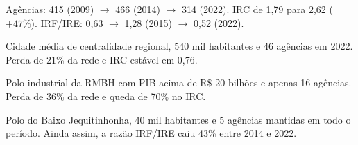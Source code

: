 \documentclass[aspectratio=169,10pt]{beamer}
\newcounter{quadrofinal}
\newcommand{\encerraanexos}{\setcounter{framenumber}{\value{quadrofinal}}}
\begin{document}
  {Agências: 415 (2009) $\to$ 466 (2014) $\to$ 314 (2022). IRC de 1,79 para 2,62
   ($+47\%$). IRF/IRE: 0,63 $\to$ 1,28 (2015) $\to$ 0,52 (2022).}

  {Cidade média de centralidade regional, 540 mil habitantes e 46 agências em 2022.
   Perda de 21\% da rede e IRC estável em 0,76.}

  {Polo industrial da RMBH com PIB acima de R\$ 20 bilhões e apenas 16 agências.
   Perda de 36\% da rede e queda de 70\% no IRC.}

  {Polo do Baixo Jequitinhonha, 40 mil habitantes e 5 agências mantidas em todo o
   período. Ainda assim, a razão IRF/IRE caiu 43\% entre 2014 e 2022.}

\encerraanexos
\end{document}
